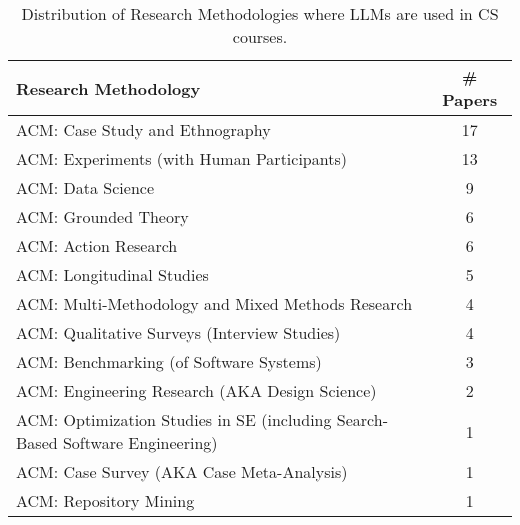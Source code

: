 \begin{table}[ht]
    \centering
    \caption{Distribution of Research Methodologies where LLMs are used in CS courses.}
    \begin{tabular}{l c}
        \toprule
        \textbf{Research Methodology} & \textbf{\# Papers} \\
        \midrule
		ACM: Case Study and Ethnography & 17 \\
		ACM: Experiments (with Human Participants) & 13 \\
		ACM: Data Science & 9 \\
		ACM: Grounded Theory & 6 \\
		ACM: Action Research & 6 \\
		ACM: Longitudinal Studies & 5 \\
		ACM: Multi-Methodology and Mixed Methods Research & 4 \\
		ACM: Qualitative Surveys (Interview Studies) & 4 \\
		ACM: Benchmarking (of Software Systems) & 3 \\
		ACM: Engineering Research (AKA Design Science) & 2 \\
		ACM: Optimization Studies in SE (including Search-Based Software Engineering) & 1 \\
		ACM: Case Survey (AKA Case Meta-Analysis) & 1 \\
		ACM: Repository Mining & 1 \\
	\bottomrule
    \end{tabular}
    \label{tab:methodologies}
\end{table}